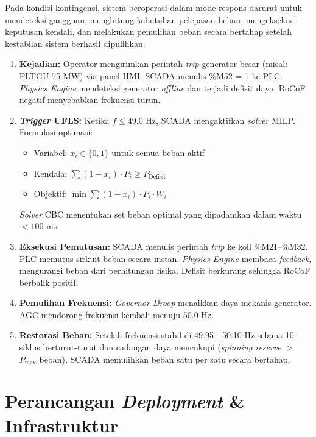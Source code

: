 Pada kondisi kontingensi, sistem beroperasi dalam mode respons darurat untuk mendeteksi gangguan, menghitung kebutuhan pelepasan beban, mengeksekusi keputusan kendali, dan melakukan pemulihan beban secara bertahap setelah kestabilan sistem berhasil dipulihkan.

\begin{enumerate}
    \item \textbf{Kejadian:} Operator mengirimkan perintah \textit{trip} generator besar (misal: PLTGU 75 MW) via panel HMI. SCADA menulis \%M52 = 1 ke PLC. \textit{Physics Engine} mendeteksi generator \textit{offline} dan terjadi defisit daya. RoCoF negatif menyebabkan frekuensi turun.

    \item \textbf{\textit{Trigger} UFLS:} Ketika $f \leq 49{.}0$ Hz, SCADA mengaktifkan \textit{solver} MILP.
    Formulasi optimasi:
    \begin{itemize}
        \item[a.] Variabel: $x_i \in \{0,1\}$ untuk semua beban aktif
        \item[b.] Kendala: $\sum (1-x_i) \cdot P_i \geq P_{\mathrm{Defisit}}$
        \item[c.] Objektif: $\min \sum (1-x_i) \cdot P_i \cdot W_i$
    \end{itemize}
    \textit{Solver} CBC menentukan set beban optimal yang dipadamkan dalam waktu $< 100$ ms.

    \item \textbf{Eksekusi Pemutusan:} SCADA menulis perintah \textit{trip} ke koil \%M21--\%M32. PLC memutus sirkuit beban secara instan. \textit{Physics Engine} membaca \textit{feedback}, mengurangi beban dari perhitungan fisika. Defisit berkurang sehingga RoCoF berbalik positif.

    \item \textbf{Pemulihan Frekuensi:} \textit{Governor Droop} menaikkan daya mekanis generator. AGC mendorong frekuensi kembali menuju 50.0 Hz.

    \item \textbf{Restorasi Beban:} Setelah frekuensi stabil di 49.95 - 50.10 Hz selama 10 siklus berturut-turut dan cadangan daya mencukupi (\textit{spinning reserve} $>$ $P_{\max}$ beban), SCADA memulihkan beban satu per satu secara bertahap.
\end{enumerate}

\section{Perancangan \textit{Deployment} \& Infrastruktur}
\label{sec:Deployment}

